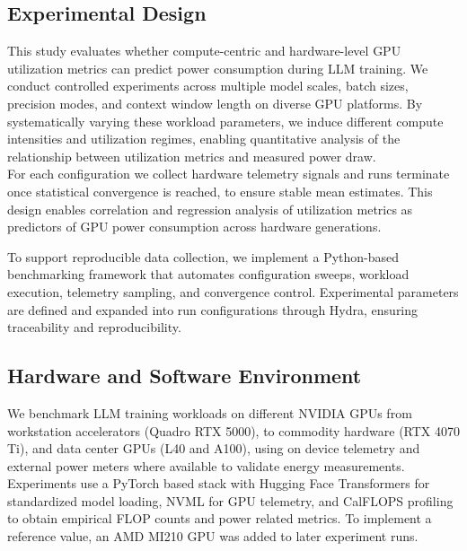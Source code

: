 \documentclass[runningheads]{llncs}
\begin{document}
\subsection{Experimental Design}\label{exp. design}
This study evaluates whether compute-centric and hardware-level GPU utilization metrics can predict power consumption during LLM training. We conduct controlled experiments across multiple model scales, batch sizes, precision modes, and context window length on diverse GPU platforms. By systematically varying these workload parameters, we induce different compute intensities and utilization regimes, enabling quantitative analysis of the relationship between utilization metrics and measured power draw.\\
For each configuration we collect hardware telemetry signals and runs terminate once statistical convergence is reached, to ensure stable mean estimates. This design enables correlation and regression analysis of utilization metrics as predictors of GPU power consumption across hardware generations.

To support reproducible data collection, we implement a Python-based benchmarking framework that automates configuration sweeps, workload execution, telemetry sampling, and convergence control. Experimental parameters are defined and expanded into run configurations through Hydra, ensuring traceability and reproducibility.

\subsection{Hardware and Software Environment}\label{Hw. & Sw. Environment}
We benchmark LLM training workloads on different NVIDIA GPUs from workstation accelerators (Quadro RTX 5000), to commodity hardware (RTX 4070 Ti), and data center GPUs (L40 and A100), using on device telemetry and external power meters where available to validate energy measurements. Experiments use a PyTorch based stack with Hugging Face Transformers for standardized model loading, NVML for GPU telemetry, and CalFLOPS profiling to obtain empirical FLOP counts and power related metrics. To implement a reference value, an AMD MI210 GPU was added to later experiment runs.
\end{document}
